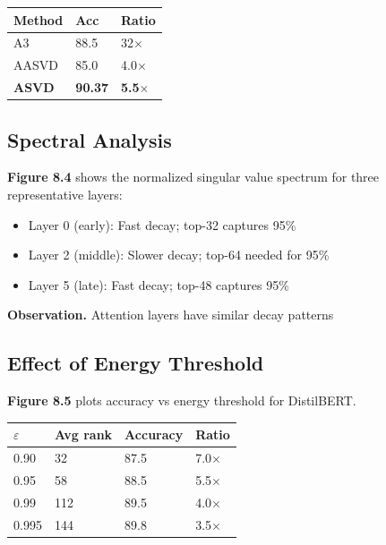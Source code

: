 \begin{table}[H]
\centering
\small
\begin{tabular}{lll}
\toprule
\textbf{Method} & \textbf{Acc} & \textbf{Ratio} \\
\midrule
A3 & 88.5 & 32$\times$ \\
AASVD & 85.0 & 4.0$\times$ \\
\textbf{ASVD} & \textbf{90.37} & \textbf{5.5$\times$} \\
\bottomrule
\end{tabular}
\end{table}

\subsection{Spectral Analysis}

\textbf{Figure 8.4} shows the normalized singular value spectrum for three 
representative layers:

\begin{itemize}
\item Layer 0 (early): Fast decay; top-32 captures 95\%
\item Layer 2 (middle): Slower decay; top-64 needed for 95\%
\item Layer 5 (late): Fast decay; top-48 captures 95\%

\end{itemize}
\textbf{Observation.} Attention layers have similar decay patterns

\subsection{Effect of Energy Threshold}

\textbf{Figure 8.5} plots accuracy vs energy threshold for DistilBERT.

\begin{table}[H]
\centering
\small
\begin{tabular}{llll}
\toprule
\textbf{$\varepsilon$} & \textbf{Avg rank} & \textbf{Accuracy} & \textbf{Ratio} \\
\midrule
0.90 & 32 & 87.5 & 7.0$\times$ \\
0.95 & 58 & 88.5 & 5.5$\times$ \\
0.99 & 112 & 89.5 & 4.0$\times$ \\
0.995 & 144 & 89.8 & 3.5$\times$ \\
\bottomrule
\end{tabular}
\end{table}

